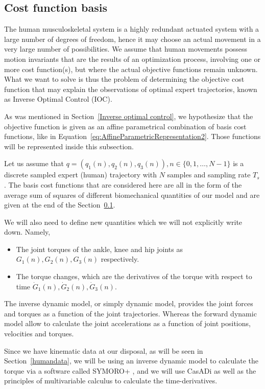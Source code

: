 \documentclass[12pt, a4paper]{article}
\begin{document}
\subsection{Cost function basis} \label{costfnbasis}
The human musculoskeletal system is a highly redundant actuated system with a large number of degrees of freedom, hence it may choose an actual movement in a very large number of possibilities. We assume that human movements possess motion invariants that are the results of an optimization process, involving one or more cost function(s), but where the actual objective functions remain unknown. What we want to solve is thus the problem of determining the objective cost function that may explain the observations of optimal expert trajectories, known as Inverse Optimal Control (IOC).\par
As was mentioned in Section~\ref{Inverse optimal control}, we hypothesize that the objective function is given as an affine parametrical combination of basis cost functions, like in Equation~\ref{eq:AffineParametricRepresentation2}. Those functions will be represented inside this subsection.\par
Let us assume that $q = (q_1(n), q_2(n), q_3(n)), n \in \{0, 1, \ldots, N-1\}$ is a discrete sampled expert (human) trajectory with $N$ samples and sampling rate $T_s$. The basis cost functions that are considered here are all in the form of the average sum of squares of different biomechanical quantities of our model and are given at the end of the Section~\ref{costfnbasis}.\par
We will also need to define new quantities which we will not explicitly write down. Namely,
\begin{itemize}
    \item The joint torques of the ankle, knee and hip joints as $G_1(n), G_2(n), G_3(n)$ respectively.
    \item The torque changes, which are the derivatives of the torque with respect to time $\dot{G}_1(n), \dot{G}_2(n), \dot{G}_3(n)$.
\end{itemize}
The inverse dynamic model, or simply dynamic model, provides the joint forces and torques as a function of the joint trajectories. Whereas the forward  dynamic model allow to calculate the joint accelerations as a function
of joint positions, velocities and torques.\par
Since we have kinematic data at our disposal, as will be seen in Section~\ref{humandata}, we will be using an inverse dynamic model to calculate the torque via a software called SYMORO+ \cite{khalil1997symoro+}, and we will use CasADi as well as the principles of multivariable calculus to calculate the time-derivatives.\par
\end{document}
